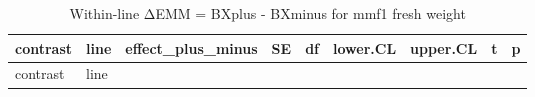 \documentclass[
  10pt,
]{article}
\begin{document}
\begin{longtable}[]{@{}
  >{\raggedright\arraybackslash}p{}
  >{\raggedright\arraybackslash}p{}
  >{\raggedleft\arraybackslash}p{}
  >{\raggedleft\arraybackslash}p{}
  >{\raggedleft\arraybackslash}p{}
  >{\raggedleft\arraybackslash}p{}
  >{\raggedleft\arraybackslash}p{}
  >{\raggedleft\arraybackslash}p{}
  >{\raggedleft\arraybackslash}p{}@{}}
\caption{Within-line ΔEMM = BXplus - BXminus for mmf1 fresh
weight}\tabularnewline
\toprule\noalign{}
\begin{minipage}[b]{\linewidth}\raggedright
contrast
\end{minipage} & \begin{minipage}[b]{\linewidth}\raggedright
line
\end{minipage} & \begin{minipage}[b]{\linewidth}\raggedleft
effect\_plus\_minus
\end{minipage} & \begin{minipage}[b]{\linewidth}\raggedleft
SE
\end{minipage} & \begin{minipage}[b]{\linewidth}\raggedleft
df
\end{minipage} & \begin{minipage}[b]{\linewidth}\raggedleft
lower.CL
\end{minipage} & \begin{minipage}[b]{\linewidth}\raggedleft
upper.CL
\end{minipage} & \begin{minipage}[b]{\linewidth}\raggedleft
t
\end{minipage} & \begin{minipage}[b]{\linewidth}\raggedleft
p
\end{minipage} \\
\midrule\noalign{}
\endfirsthead
\toprule\noalign{}
\begin{minipage}[b]{\linewidth}\raggedright
contrast
\end{minipage} & \begin{minipage}[b]{\linewidth}\raggedright
line
\end{minipage} & \begin{minipage}[b]{\linewidth}\raggedleft

\end{minipage}
\end{longtable}
\end{document}
